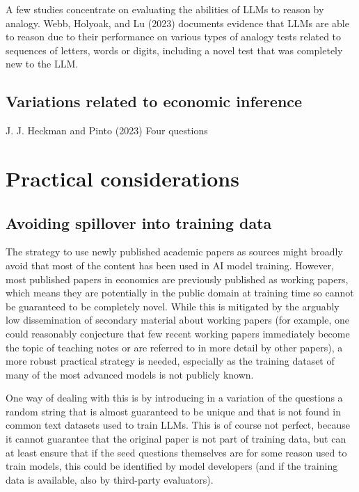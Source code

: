 \documentclass[
]{article}
\theoremstyle{plain}
\theoremstyle{definition}
\theoremstyle{remark}
\begin{document}
A few studies concentrate on evaluating the abilities of LLMs to reason
by analogy. Webb, Holyoak, and Lu (2023) documents evidence that LLMs
are able to reason due to their performance on various types of analogy
tests related to sequences of letters, words or digits, including a
novel test that was completely new to the LLM.

\subsection{Variations related to economic
inference}\label{variations-related-to-economic-inference}

J. J. Heckman and Pinto (2023) Four questions

\section{Practical considerations}\label{practical-considerations}

\subsection{Avoiding spillover into training
data}\label{avoiding-spillover-into-training-data}

The strategy to use newly published academic papers as sources might
broadly avoid that most of the content has been used in AI model
training. However, most published papers in economics are previously
published as working papers, which means they are potentially in the
public domain at training time so cannot be guaranteed to be completely
novel. While this is mitigated by the arguably low dissemination of
secondary material about working papers (for example, one could
reasonably conjecture that few recent working papers immediately become
the topic of teaching notes or are referred to in more detail by other
papers), a more robust practical strategy is needed, especially as the
training dataset of many of the most advanced models is not publicly
known.

One way of dealing with this is by introducing in a variation of the
questions a random string that is almost guaranteed to be unique and
that is not found in common text datasets used to train LLMs. This is of
course not perfect, because it cannot guarantee that the original paper
is not part of training data, but can at least ensure that if the seed
questions themselves are for some reason used to train models, this
could be identified by model developers (and if the training data is
available, also by third-party evaluators).
\end{document}
